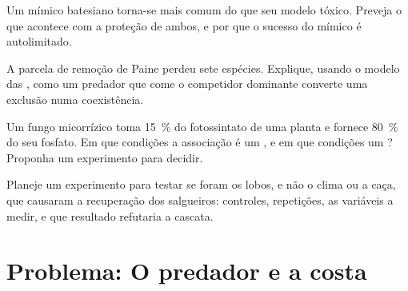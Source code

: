 \begin{exercise}[$\star\star$]\label{exo:b1:species-interactions:9}
Um mímico batesiano torna-se mais comum do que seu modelo tóxico.
Preveja o que acontece com a proteção de ambos, e por que o sucesso do
mímico é autolimitado.
\end{exercise}

\begin{exercise}[$\star\star\star$]\label{exo:b1:species-interactions:10}
A parcela de remoção de Paine perdeu sete espécies. Explique, usando o
modelo das , como um predador que come o competidor dominante
converte uma exclusão numa coexistência.
\end{exercise}

\begin{exercise}[$\star\star\star$]\label{exo:b1:species-interactions:11}
Um fungo micorrízico toma \qty{15}{\%} do fotossintato de uma planta e
fornece \qty{80}{\%} do seu fosfato. Em que condições a associação é um
, e em que condições um ? Proponha um experimento
para decidir.
\end{exercise}

\begin{exercise}[$\star\star\star$]\label{exo:b1:species-interactions:12}
Planeje um experimento para testar se foram os lobos, e não o clima ou
a caça, que causaram a recuperação dos salgueiros: controles,
repetições, as variáveis a medir, e que resultado refutaria a cascata.
\end{exercise}

\section{Problema: O predador e a costa}

